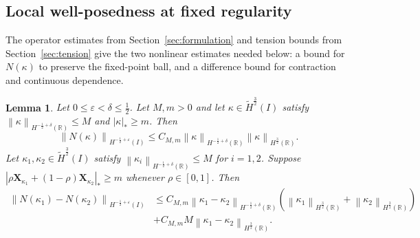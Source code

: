 \documentclass[11pt,reqno]{amsart}
\theoremstyle{plain}
\newtheorem{lemma}[theorem]{Lemma}
\theoremstyle{definition}
\numberwithin{equation}{section}
\newcommand{\paren}[1]{\left(#1\right)}
\newcommand{\wt}[1]{\widetilde{#1}}
\newcommand{\bm}[1]{\boldsymbol{#1}}
\newcommand{\abs}[1]{\left\lvert #1 \right\rvert}
\newcommand{\norm}[1]{\left\lVert #1 \right\rVert}
\newcommand{\R}{\mathbb{R}}
\newcommand{\xka}[1]{\bm X_{\kappa_{#1}}}
\newcommand{\hi}[1]{H^{#1}(I)}
\newcommand{\thi}[1]{\wt H^{#1}(I)}
\newcommand{\hr}[1]{H^{#1}(\R)}
\begin{document}

\subsection{Local well-posedness at fixed regularity}
\label{subsec:local-proof}
The operator estimates from Section~\ref{sec:formulation} and tension
bounds from Section~\ref{sec:tension} give the two nonlinear estimates
needed below: a bound for $N(\kappa)$ to preserve the fixed-point ball,
and a difference bound for contraction and continuous dependence.

\begin{lemma}\label{lem:N-est}
Let $0 \le \varepsilon < \delta \le \frac{1}{2}$.
Let $M,m>0$ and let $\kappa\in\thi{\frac{3}{2}}$ satisfy
$\norm{\kappa}_{\hr{-\frac12+\delta}}\le M$ and $\abs{\kappa}_*\ge m$. Then
\begin{equation}\label{eqn:N-pointwise-bound}
    \norm{N(\kappa)}_{\hi{-\frac{1}{2}+\varepsilon}}
    \le C_{M,m}
    \norm{\kappa}_{\hr{-\frac{1}{2}+\delta}}
    \norm{\kappa}_{\hr{\frac{3}{2}}} .
\end{equation}
Let $\kappa_1,\kappa_2\in\thi{\frac{3}{2}}$ satisfy
$\norm{\kappa_i}_{\hr{-\frac{1}{2}+\delta}}\le M$ for $i=1,2$. Suppose
$\abs{\rho\xka{1}+\paren{1-\rho}\xka{2}}_*\ge m$ whenever
$\rho\in[0,1]$.
Then
\begin{equation}\label{eqn:N-pointwise-difference}
\begin{aligned}
    \norm{N(\kappa_1) - N(\kappa_2)}_{\hi{-\frac{1}{2}+\varepsilon}} &\le C_{M,m} \norm{\kappa_1-\kappa_2}_{\hr{-\frac{1}{2}+\delta}} \paren{\norm{\kappa_1}_{\hr{\frac{3}{2}}}+\norm{\kappa_2}_{\hr{\frac{3}{2}}}} \\
    & + C_{M,m}M \norm{\kappa_1-\kappa_2}_{\hr{\frac{3}{2}}}.
\end{aligned}
\end{equation}
\end{lemma}
\end{document}
